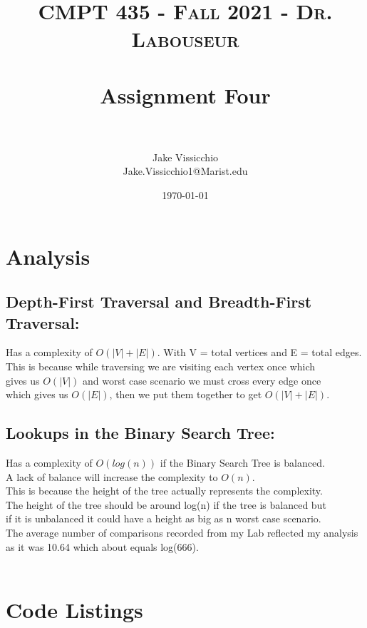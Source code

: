 \documentclass[letterpaper, 10pt]{article}
\title{	
   \normalfont\normalsize 
   \textsc{CMPT 435 - Fall 2021 - Dr. Labouseur} \\[10pt] %
   \horrule{0.5pt} \\[0.25cm] 	%
   \huge Assignment Four \\   %
   \horrule{0.5pt} \\[0.25cm] 	%
}
\author{Jake Vissicchio \\ \normalsize Jake.Vissicchio1@Marist.edu}
\date{\normalsize\today} 	%
\begin{document}
\maketitle %



\section{Analysis}
\noindent
\subsection{Depth-First Traversal and Breadth-First Traversal:}
Has a complexity of $O(|V| + |E|)$. With V = total vertices and
E = total edges.\\
This is because while traversing we are visiting each vertex once which\\
gives us $O(|V|)$ and worst case scenario we must cross every edge once\\
which gives us $O(|E|)$, then we put them together to get $O(|V| + |E|)$.\\

\subsection{Lookups in the Binary Search Tree:}
Has a complexity of $O(log(n))$ if the Binary Search Tree is balanced. \\
A lack of balance will increase the complexity to $O(n)$.\\
This is because the height of the tree actually represents the complexity.\\
The height of the tree should be around log(n) if the tree is balanced but\\
if it is unbalanced it could have a height as big as n worst case scenario.\\
The average number of comparisons recorded from my Lab reflected my analysis\\
as it was 10.64 which about equals log(666).\\
\\

\section{Code Listings}
\noindent
\end{document}
